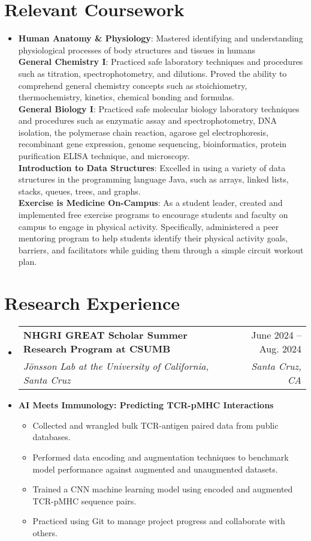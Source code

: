 \documentclass[letterpaper,11pt]{article}
\makeatletter
\newcommand{\resumeItem}[1]{
  \item\small{
    {#1 \vspace{-2pt}}
  }
}
\newcommand{\resumeSubheading}[4]{
  \vspace{-2pt}\item
    \begin{tabular*}{0.97\textwidth}[t]{l@{\extracolsep{\fill}}r}
      \textbf{#1} & #2 \\
      \textit{\small#3} & \textit{\small #4} \\
    \end{tabular*}\vspace{-7pt}
}
\newcommand{\resumeSubHeadingListStart}{\begin{itemize}[leftmargin=0.15in, label={}]}
\newcommand{\resumeSubHeadingListEnd}{\end{itemize}}
\newcommand{\resumeItemListStart}{\begin{itemize}}
\newcommand{\resumeItemListEnd}{\end{itemize}\vspace{-5pt}}
\makeatother
\begin{document}
\section{Relevant Coursework}
 \begin{itemize}[leftmargin=0.15in, label={}]
    \item{
     \textbf{Human Anatomy \& Physiology}{: Mastered identifying and understanding physiological processes of body structures and tissues in humans} \\
     \textbf{General Chemistry I}{: Practiced safe laboratory techniques and procedures such as titration, spectrophotometry, and dilutions. Proved the ability to comprehend general chemistry concepts such as stoichiometry, thermochemistry, kinetics, chemical bonding and formulas.} \\
     \textbf{General Biology I}{: Practiced safe molecular biology laboratory techniques and procedures such as enzymatic assay and spectrophotometry, DNA isolation, the polymerase chain reaction, agarose gel electrophoresis, recombinant gene expression, genome sequencing, bioinformatics, protein purification ELISA technique, and microscopy.} \\
     \textbf{Introduction to Data Structures}{: Excelled in using a variety of data structures in the programming language Java, such as arrays, linked lists, stacks, queues, trees, and graphs.} \\
     \textbf{Exercise is Medicine On-Campus}{: As a student leader, created and implemented free exercise programs to encourage students and faculty on campus to engage in physical activity. Specifically, administered a peer mentoring program to help students identify their physical activity goals, barriers, and facilitators while guiding them through a simple circuit workout plan.
}
    }
 \end{itemize}

\section{Research Experience}
    \resumeSubHeadingListStart
        \resumeSubheading
            {NHGRI GREAT Scholar Summer Research Program at CSUMB}{June 2024 -- Aug. 2024}
            {Jönsson Lab at the University of California, Santa Cruz}{Santa Cruz, CA}
        \resumeItem{\textbf{{AI Meets Immunology: Predicting TCR-pMHC Interactions}}}
        \resumeItemListStart
            \resumeItem{Collected and wrangled bulk TCR-antigen paired data from public databases.}
            \resumeItem{Performed data encoding and augmentation techniques to benchmark model performance against augmented and unaugmented datasets.}
            \resumeItem{Trained a CNN machine learning model using encoded and augmented TCR-pMHC sequence pairs.}
            \resumeItem{Practiced using Git to manage project progress and collaborate with others.}
        \resumeItemListEnd
    \resumeSubHeadingListEnd
\end{document}
